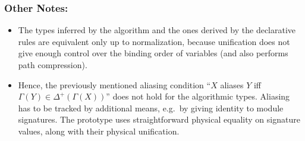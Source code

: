 \documentclass[10pt,a4paper]{article}
\newcommand\note[1]{\noindent #1}
\begin{document}
\note{
\subsubsection*{Other Notes:}
\begin{itemize}
\item The types inferred by the algorithm and the ones derived by the declarative rules are equivalent only up to normalization, because unification does not give enough control over the binding order of variables (and also performs path compression).
\item Hence, the previously mentioned aliasing condition ``$X$ aliases $Y$ iff $\Gamma(Y) \in \Delta^+(\Gamma(X))$'' does not hold for the algorithmic types. Aliasing has to be tracked by additional means, e.g.\ by giving identity to module signatures. The prototype uses straightforward physical equality on signature values, along with their physical unification.
\end{itemize}
}
\end{document}
